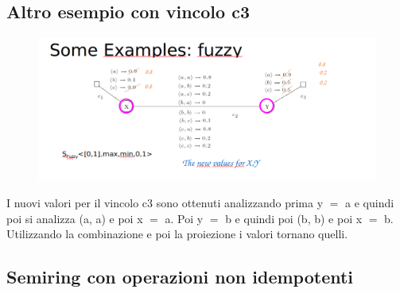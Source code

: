 \subsection{Altro esempio con vincolo c3}
\begin{figure}[htp]
	\centering
    \includegraphics[width=16cm, keepaspectratio]{latex/img/Cap5/FUZZY2.png}
\end{figure}
I nuovi valori per il vincolo c3 sono ottenuti analizzando prima y $=$ a e quindi poi si analizza (a, a) e poi x $=$ a. Poi y $=$ b e quindi poi (b, b) e poi x $=$ b. Utilizzando la combinazione e poi la proiezione i valori tornano quelli.
\subsection{Semiring con operazioni non idempotenti}
